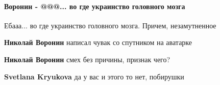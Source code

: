  
 
 
 
 
\paragraph{Воронин - @@@... во где украинство головного мозга}
\label{sec:14_07_2021.fb.krjukova_svetlana.1.statja_putina_mnenie.cmt.voronin_ukrainstvo_mozga}

\begin{itemize}

 

Ебааа... во где украинство головного мозга. Причем, незамутненное 🤣🤣🤣

\begin{itemize}

 
\textbf{Николай Воронин} написал чувак со спутником на аватарке

 
\textbf{Николай Воронин} смех без причины, признак чего?

 
\textbf{Svetlana Kryukova} да у вас и этого то нет, побирушки 🤣


\end{itemize}
\end{itemize}

